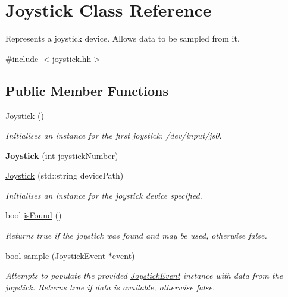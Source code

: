\hypertarget{classJoystick}{\section{\-Joystick \-Class \-Reference}
\label{classJoystick}
}


\-Represents a joystick device. \-Allows data to be sampled from it.  




{\ttfamily \#include $<$joystick.\-hh$>$}

\subsection*{\-Public \-Member \-Functions}
\begin{DoxyCompactItemize}
\item 
\hyperlink{classJoystick_a158b1f77b78717efbf1b8fac43b1fcef}{\-Joystick} ()
\begin{DoxyCompactList}\small\item\em \-Initialises an instance for the first joystick\-: /dev/input/js0. \end{DoxyCompactList}\item 
\hypertarget{classJoystick_a0bd88249a8e103fe326d5345019a3de2}{{\bfseries \-Joystick} (int joystick\-Number)}\label{classJoystick_a0bd88249a8e103fe326d5345019a3de2}

\item 
\hypertarget{classJoystick_ac0cd7f0cb955fd62850589e1f0660285}{\hyperlink{classJoystick_ac0cd7f0cb955fd62850589e1f0660285}{\-Joystick} (std\-::string device\-Path)}\label{classJoystick_ac0cd7f0cb955fd62850589e1f0660285}

\begin{DoxyCompactList}\small\item\em \-Initialises an instance for the joystick device specified. \end{DoxyCompactList}\item 
\hypertarget{classJoystick_a466b80d028a829cb4aa24ae60602c646}{bool \hyperlink{classJoystick_a466b80d028a829cb4aa24ae60602c646}{is\-Found} ()}\label{classJoystick_a466b80d028a829cb4aa24ae60602c646}

\begin{DoxyCompactList}\small\item\em \-Returns true if the joystick was found and may be used, otherwise false. \end{DoxyCompactList}\item 
\hypertarget{classJoystick_a13d48d8d9a32a788394f69472b6b3d9d}{bool \hyperlink{classJoystick_a13d48d8d9a32a788394f69472b6b3d9d}{sample} (\hyperlink{classJoystickEvent}{\-Joystick\-Event} $\ast$event)}\label{classJoystick_a13d48d8d9a32a788394f69472b6b3d9d}

\begin{DoxyCompactList}\small\item\em \-Attempts to populate the provided \hyperlink{classJoystickEvent}{\-Joystick\-Event} instance with data from the joystick. \-Returns true if data is available, otherwise false. \end{DoxyCompactList}\end{DoxyCompactItemize}
